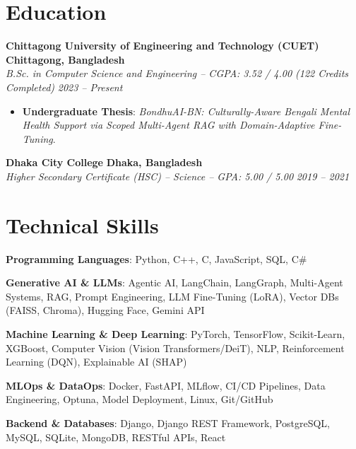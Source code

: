 \documentclass[a4paper,10pt]{article}
\begin{document}
\section{Education}
\vspace{2pt}
\noindent\textbf{Chittagong University of Engineering and Technology (CUET)} \hfill \textbf{Chittagong, Bangladesh} \\
\textit{B.Sc. in Computer Science and Engineering -- CGPA: 3.52 / 4.00 (122 Credits Completed)} \hfill \textit{2023 -- Present}
\begin{itemize}[leftmargin=12pt, topsep=1pt, itemsep=1.5pt]
  \item \textbf{Undergraduate Thesis}: \textit{BondhuAI-BN: Culturally-Aware Bengali Mental Health Support via Scoped Multi-Agent RAG with Domain-Adaptive Fine-Tuning}.
\end{itemize}

\vspace{2pt}
\noindent\textbf{Dhaka City College} \hfill \textbf{Dhaka, Bangladesh} \\
\textit{Higher Secondary Certificate (HSC) -- Science -- GPA: 5.00 / 5.00} \hfill \textit{2019 -- 2021}

\section{Technical Skills}
\begin{itemize}[leftmargin=12pt, label={$\bullet$}, topsep=1pt, itemsep=2pt]
  \small{
    \item \textbf{Programming Languages}: Python, C++, C, JavaScript, SQL, C\#
    \item \textbf{Generative AI \& LLMs}: Agentic AI, LangChain, LangGraph, Multi-Agent Systems, RAG, Prompt Engineering, LLM Fine-Tuning (LoRA), Vector DBs (FAISS, Chroma), Hugging Face, Gemini API
    \item \textbf{Machine Learning \& Deep Learning}: PyTorch, TensorFlow, Scikit-Learn, XGBoost, Computer Vision (Vision Transformers/DeiT), NLP, Reinforcement Learning (DQN), Explainable AI (SHAP)
    \item \textbf{MLOps \& DataOps}: Docker, FastAPI, MLflow, CI/CD Pipelines, Data Engineering, Optuna, Model Deployment, Linux, Git/GitHub
    \item \textbf{Backend \& Databases}: Django, Django REST Framework, PostgreSQL, MySQL, SQLite, MongoDB, RESTful APIs, React
  }
\end{itemize}
\end{document}
